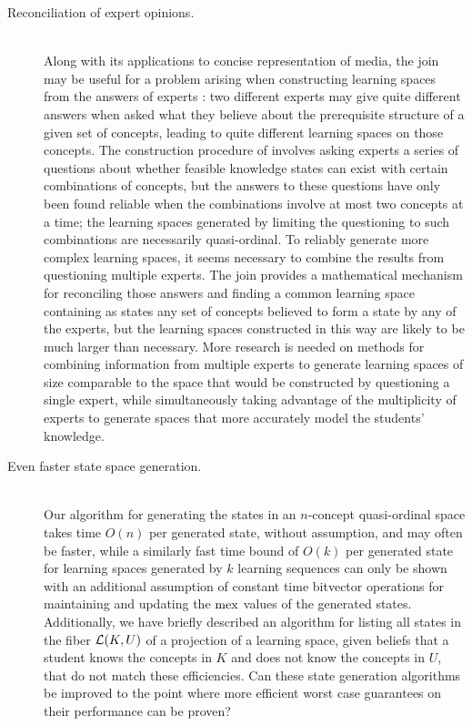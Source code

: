 \documentclass[11pt]{llncs}
\begin{document}
{\begin{description}
\item[Reconciliation of expert opinions.] \hfill\\
Along with its applications to concise representation of media, the join may be useful for a problem arising when constructing learning spaces from the answers of experts \citep{dowling:93a}: two different experts may give quite different answers when asked what they believe about the prerequisite structure of a given set of concepts, leading to quite different learning spaces on those concepts. The construction procedure of \citet{dowling:93a} involves asking experts a series of questions about whether feasible knowledge states can exist with certain combinations of concepts, but the answers to these questions have only been found reliable when the combinations involve at most two concepts at a time; the learning spaces generated by limiting the questioning to such combinations are necessarily quasi-ordinal.  To reliably generate more complex learning spaces, it seems necessary to combine the results from questioning multiple experts.
The join provides a mathematical mechanism for reconciling those answers and finding a common learning space containing as states any set of concepts believed to form a state by any of the experts,
but the learning spaces constructed in this way are likely to be much larger than necessary.
More research is needed on methods for combining information from multiple experts to generate learning spaces of size comparable to the space that would be constructed by questioning a single expert, while simultaneously taking advantage of the multiplicity of experts to generate spaces that more accurately model the students' knowledge.

\item[Even faster state space generation.] \hfill\\
Our algorithm for generating the states in an $n$-concept quasi-ordinal space takes time $O(n)$ per generated state, without assumption, and may often be faster, while a similarly fast time bound of $O(k)$ per generated state for learning spaces generated by $k$ learning sequences can only  be shown with an additional assumption of constant time bitvector operations for maintaining and updating the ${\rm mex}$ values of the generated states. Additionally, we have briefly described an algorithm for listing all states in the fiber ${\cal L}(K,U)$ of a projection of a learning space, given beliefs that a student knows the concepts in $K$ and does not know the concepts in $U$, that do not match these efficiencies. Can these state generation algorithms be improved to the point where more efficient worst case guarantees on their performance can be proven?


\end{description}}
\end{document}
